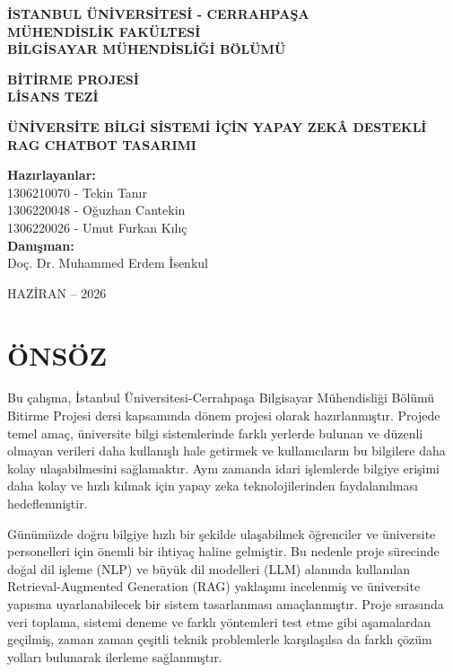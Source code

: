\documentclass[12pt,a4paper]{report}
\newcommand{\university}{İSTANBUL ÜNİVERSİTESİ - CERRAHPAŞA}
\newcommand{\faculty}{MÜHENDİSLİK FAKÜLTESİ}
\newcommand{\department}{BİLGİSAYAR MÜHENDİSLİĞİ BÖLÜMÜ}
\newcommand{\course}{BİTİRME PROJESİ \\ LİSANS TEZİ}
\newcommand{\projecttitle}{ÜNİVERSİTE BİLGİ SİSTEMİ İÇİN YAPAY ZEKÂ DESTEKLİ RAG CHATBOT TASARIMI}
\newcommand{\advisor}{Doç. Dr. Muhammed Erdem İsenkul}
\newcommand{\dateinfo}{HAZİRAN -- 2026}
\begin{document}
\begin{titlepage}
  \centering

  {\bfseries\large \university \\[0.5cm]}
  {\bfseries\large \faculty \\[0.5cm]}
  {\bfseries\large \department \\[2cm]}

  {\bfseries\large \course \\[2cm]}

  {\bfseries\Large \projecttitle \\[2.5cm]}

  \textbf{Hazırlayanlar:}\\[0.2cm]
  1306210070 - Tekin Tanır \\[0.3cm]
  1306220048 - Oğuzhan Cantekin \\[0.3cm]
  1306220026 - Umut Furkan Kılıç \\[0.3cm]

  \vspace{1cm}
  \textbf{Danışman:}\\[0.2cm]
  \advisor

  \vfill
  {\dateinfo}
\end{titlepage}


\chapter*{ÖNSÖZ}

Bu çalışma, İstanbul Üniversitesi-Cerrahpaşa Bilgisayar Mühendisliği Bölümü Bitirme Projesi dersi kapsamında dönem projesi olarak hazırlanmıştır. Projede temel amaç, üniversite bilgi sistemlerinde farklı yerlerde bulunan ve düzenli olmayan verileri daha kullanışlı hale getirmek ve kullanıcıların bu bilgilere daha kolay ulaşabilmesini sağlamaktır. Aynı zamanda idari işlemlerde bilgiye erişimi daha kolay ve hızlı kılmak için yapay zeka teknolojilerinden faydalanılması hedeflenmiştir.

Günümüzde doğru bilgiye hızlı bir şekilde ulaşabilmek öğrenciler ve üniversite personelleri için önemli bir ihtiyaç haline gelmiştir. Bu nedenle proje sürecinde doğal dil işleme (NLP) ve büyük dil modelleri (LLM) alanında kullanılan Retrieval-Augmented Generation (RAG) yaklaşımı incelenmiş ve üniversite yapısına uyarlanabilecek bir sistem tasarlanması amaçlanmıştır. Proje sırasında veri toplama, sistemi deneme ve farklı yöntemleri test etme gibi aşamalardan geçilmiş, zaman zaman çeşitli teknik problemlerle karşılaşılsa da farklı çözüm yolları bulunarak ilerleme sağlanmıştır.
\end{document}

